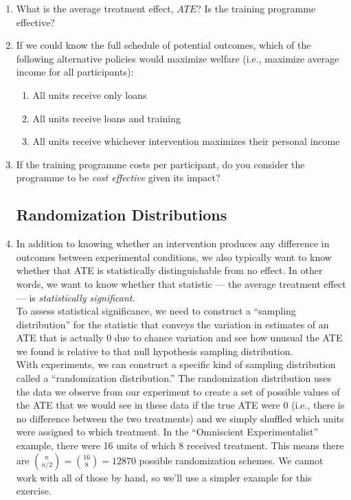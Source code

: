\documentclass[a4paper,12pt]{article}
\begin{document}
\begin{enumerate}
\item What is the average treatment effect, $ATE$? Is the training programme effective?

\item If we could know the full schedule of potential outcomes, which of the following alternative policies would maximize welfare (i.e., maximize average income for all participants):

	\begin{enumerate}
	\item All units receive only loans
	\item All units receive loans and training
	\item All units receive whichever intervention maximizes their personal income
	\end{enumerate}

\item If the training programme costs  per participant, do you consider the programme to be \textit{cost effective} given its impact?


\subsection*{Randomization Distributions}

\item In addition to knowing whether an intervention produces any difference in outcomes between experimental conditions, we also typically want to know whether that ATE is statistically distinguishable from no effect. In other words, we want to know whether that statistic --- the average treatment effect --- is \textit{statistically significant}.\\

\noindent To assess statistical significance, we need to construct a ``sampling distribution'' for the statistic that conveys the variation in estimates of an ATE that is actually 0 due to chance variation and see how unusual the ATE we found is relative to that null hypothesis sampling distribution.\\

\noindent With experiments, we can construct a specific kind of sampling distribution called a ``randomization distribution.'' The randomization distribution uses the data we observe from our experiment to create a set of possible values of the ATE that we would see in these data if the true ATE were 0 (i.e., there is no difference between the two treatments) and we simply shuffled which units were assigned to which treatment. In the ``Omniscient Experimentalist'' example, there were 16 units of which 8 received treatment. This means there are ${{n}\choose{n/2}} = {{16}\choose{8}} = 12870$ possible randomization schemes. We cannot work with all of those by hand, so we'll use a simpler example for this exercise.\\


\end{enumerate}
\end{document}

